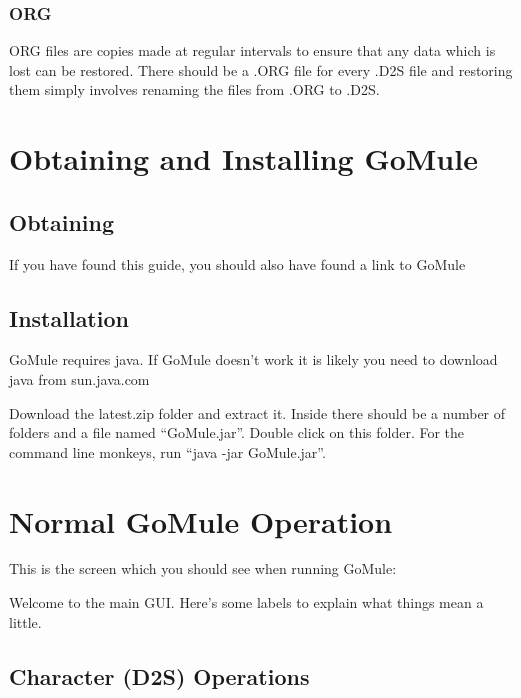 \documentclass[a4paper,10pt]{article}
\begin{document}
\subsubsection{ORG}

ORG files are copies made at regular intervals to ensure that any data which is lost can be restored. There should be a .ORG file for every .D2S file and restoring them simply involves renaming the files from .ORG to .D2S.

\section{Obtaining and Installing GoMule}

\subsection{Obtaining}

If you have found this guide, you should also have found a link to GoMule

\subsection{Installation}

GoMule requires java. If GoMule doesn't work it is likely you need to download java from sun.java.com

Download the latest.zip folder and extract it. Inside there should be a number of folders and a file named ``GoMule.jar''. Double click on this folder. For the command line monkeys, run ``java -jar GoMule.jar''.

\section{Normal GoMule Operation}

This is the screen which you should see when running GoMule:

\begin{figure}[htp]
\centering
{}
\end{figure}

Welcome to the main GUI. Here's some labels to explain what things mean a little.

\begin{figure}[htp]
\centering
{}
\end{figure}

\subsection{Character (D2S) Operations}
\end{document}
